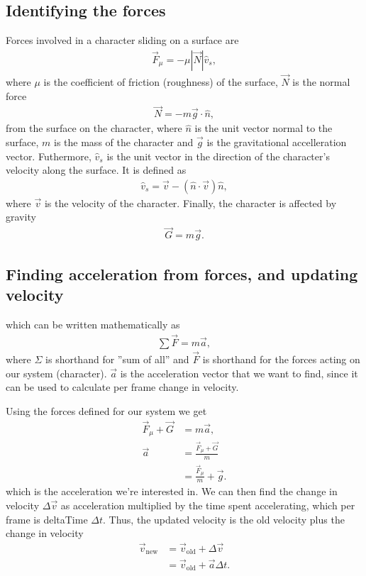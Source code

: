 \documentclass[%
notitlepage,
 amsmath,amssymb,
 aps,
]{revtex4-2}  %
\begin{document}
\subsection{Identifying the forces} \label{sec:Sliding:subsec:FindForces}
Forces involved in a character sliding on a surface are
\begin{align*}
	\vec{F}_{\mu} = -\mu |\vec{N}| \hat{v}_{s},
\end{align*}
where \(\mu\) is the coefficient of friction (roughness) of the surface, \(\vec{N}\) is the normal force
\begin{align*}
	\vec{N} = - m\vec{g}\cdot \hat{n},
\end{align*}
from the surface on the  character, where \(\hat{n}\) is the unit vector normal to the surface, \(m\) is the mass of the character and \(\vec{g}\) is the gravitational accelleration vector. Futhermore, \(\hat{v}_{s}\) is the unit vector in the direction of the character's velocity along the surface. It is defined as
\begin{align*}
	\hat{v}_{s} = \vec{v} - \left(\hat{n} \cdot \vec{v}\right)\hat{n},
\end{align*}
where \(\vec{v}\) is the velocity of the character.
Finally, the character is affected by gravity
\begin{align*}
	\vec{G} = m\vec{g}.
\end{align*}

\subsection{Finding acceleration from forces, and updating velocity} \label{sec:Sliding:subsec:Accel}
which can be written mathematically as
\begin{align*}
	\sum \vec{F} = m\vec{a},
\end{align*}
where \(\Sigma\) is shorthand for ''sum of all'' and \(\vec{F}\) is shorthand for the forces acting on our system (character). \(\vec{a}\) is the acceleration vector that we want to find, since it can be used to calculate per frame change in velocity.
 
Using the forces defined for our system we get
 \begin{align*}
    \vec{F}_{\mu} + \vec{G} &= m\vec{a}, \\
    \vec{a} &= \frac{\vec{F}_{\mu} + \vec{G}}{m} \\
            &= \frac{\vec{F}_{\mu}}{m} + \vec{g}.
\end{align*}
which is the acceleration we're interested in. We can then find the change in velocity \(\Delta\vec{v}\) as acceleration multiplied by the time spent accelerating, which per frame is deltaTime \(\Delta t\). Thus, the updated velocity is the old velocity plus the change in velocity
\begin{align*}
    \vec{v}_{\text{new}} &= \vec{v}_{\text{old}} + \Delta\vec{v} \\
                         &= \vec{v}_{\text{old}} + \vec{a}\Delta t.
\end{align*}
\end{document}
